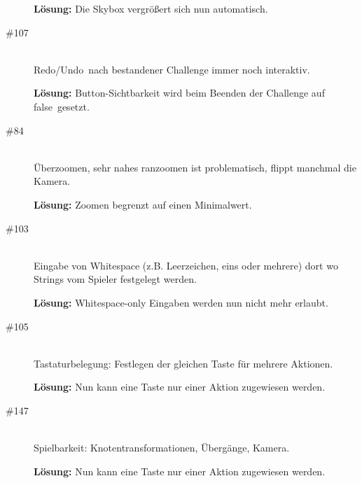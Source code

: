 \begin{description}
{\bfseries Lösung:} Die Skybox vergrößert sich nun automatisch.


\item[\#107] \hfill \\

\glqq Redo/Undo\grqq~nach bestandener Challenge immer noch interaktiv. 

{\bfseries Lösung:} Button-Sichtbarkeit wird beim Beenden der Challenge auf 
\glqq false\grqq~gesetzt.

\item[\#84] \hfill \\

\glqq Überzoomen\grqq, sehr nahes ranzoomen ist problematisch, flippt manchmal die Kamera.

{\bfseries Lösung:} Zoomen begrenzt auf einen Minimalwert.


\item[\#103] \hfill \\
Eingabe von Whitespace (z.B. Leerzeichen, eins oder mehrere) dort wo Strings vom Spieler festgelegt werden. 

{\bfseries Lösung:} Whitespace-only Eingaben werden nun nicht mehr erlaubt.


\item[\#105] \hfill \\
Tastaturbelegung: Festlegen der gleichen Taste für mehrere Aktionen. 

{\bfseries Lösung:} Nun kann eine Taste nur einer Aktion zugewiesen werden.


\item[\#147] \hfill \\
Spielbarkeit: Knotentransformationen, Übergänge, Kamera. 

{\bfseries Lösung:} Nun kann eine Taste nur einer Aktion zugewiesen werden.


\end{description}

~\\


